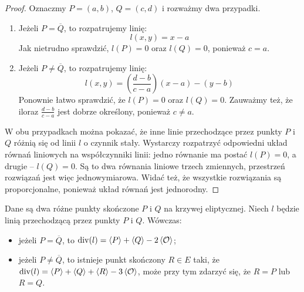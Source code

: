 \begin{proof}
Oznaczmy $P = (a, b)$, $Q = (c, d)$ i rozważmy dwa przypadki.
\begin{enumerate}
\item
Jeżeli $P = \overline{Q}$,
to rozpatrujemy linię:
\begin{equation}
l(x, y) = x - a
\end{equation}
Jak nietrudno sprawdzić, $l(P) = 0$ oraz $l(Q) = 0$,
ponieważ $c = a$.
\item
Jeżeli $P \neq \overline{Q}$,
to rozpatrujemy linię:
\begin{equation}
l(x, y) = \left(\frac{d-b}{c-a}\right)(x - a) - (y - b)
\end{equation}
Ponownie łatwo sprawdzić, że $l(P) = 0$ oraz $l(Q) = 0$.
Zauważmy też,
że iloraz $\frac{d-b}{c-a}$ jest dobrze określony,
ponieważ $c \neq a$.
\end{enumerate}

W obu przypadkach można pokazać, że inne linie
przechodzące przez punkty $P$ i $Q$ różnią się od linii $l$ o czynnik stały.
Wystarczy rozpatrzyć odpowiedni układ równań liniowych
na współczynniki linii:
jedno równanie ma postać $l(P) = 0$, a drugie -- $l(Q) = 0$.
Są to dwa równania liniowe trzech zmiennych,
przestrzeń rozwiązań jest więc jednowymiarowa.
Widać też, że wszystkie rozwiązania są proporcjonalne,
ponieważ układ równań jest jednorodny.
\end{proof}

\begin{theorem}
Dane są dwa różne punkty skończone $P$ i $Q$ na krzywej eliptycznej.
Niech $l$ będzie linią przechodzącą przez punkty $P$ i $Q$.
Wówczas:
\begin{itemize}
\item jeżeli $P = \overline{Q}$,
to $\operatorname{div}(l) = \left\langle P\right\rangle + \left\langle Q\right\rangle - 2\left\langle\mathcal{O}\right\rangle$;
\item jeżeli $P \neq \overline{Q}$,
to istnieje punkt skończony $R \in E$ taki,
że $\operatorname{div}(l) = \left\langle P\right\rangle + \left\langle Q\right\rangle + \left\langle R\right\rangle - 3\left\langle\mathcal{O}\right\rangle$,
może przy tym zdarzyć się, że $R = P$ lub $R = Q$.
\end{itemize}
\end{theorem}

